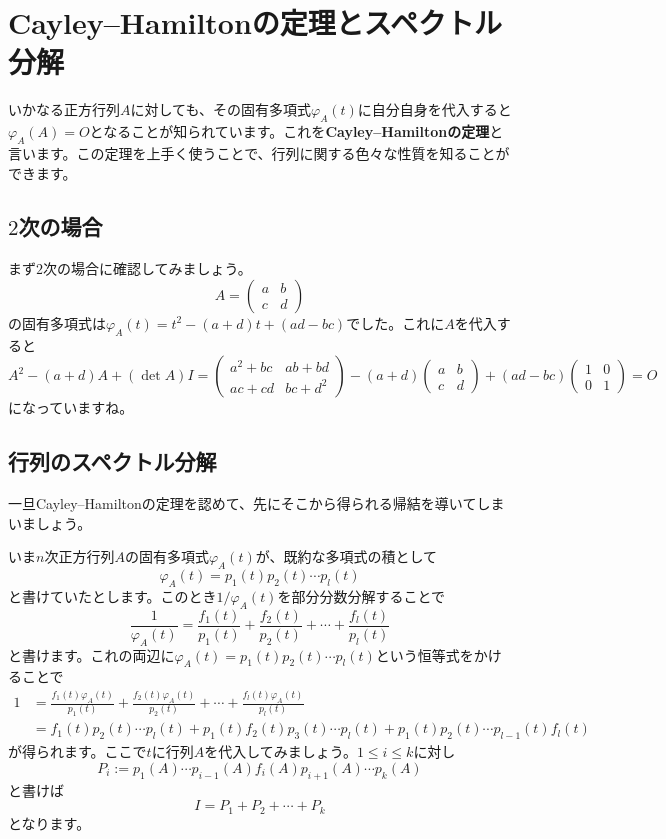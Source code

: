 \section{Cayley--Hamiltonの定理とスペクトル分解}

いかなる正方行列$A$に対しても、その固有多項式$\varphi_A(t)$に自分自身を代入すると$\varphi_A(A) = O$となることが知られています。これを\textbf{Cayley--Hamiltonの定理}と言います。この定理を上手く使うことで、行列に関する色々な性質を知ることができます。

\subsection{$2$次の場合}

まず$2$次の場合に確認してみましょう。
\[
A = 
\begin{pmatrix}
a & b \\
c & d
\end{pmatrix}
\]
の固有多項式は$\varphi_A(t) = t^2 - (a + d)t + (ad - bc)$でした。これに$A$を代入すると
\[
A^2 - (a + d)A + (\det A)I
= 
\begin{pmatrix}
a^2 + bc & ab + bd \\
ac + cd & bc + d^2
\end{pmatrix}
- (a + d)
\begin{pmatrix}
a & b \\
c & d
\end{pmatrix}
+ (ad - bc)
\begin{pmatrix}
1 & 0 \\
0 & 1
\end{pmatrix}
= O
\]
になっていますね。

\subsection{行列のスペクトル分解}

一旦Cayley--Hamiltonの定理を認めて、先にそこから得られる帰結を導いてしまいましょう。

いま$n$次正方行列$A$の固有多項式$\varphi_A(t)$が、既約な多項式の積として
\[
\varphi_A(t) = p_1(t) p_2(t) \cdots p_l(t)
\]
と書けていたとします。このとき$1/\varphi_A(t)$を部分分数分解することで
\[
\frac{1}{\varphi_A(t)} = \frac{f_1(t)}{p_1(t)} + \frac{f_2(t)}{p_2(t)} + \cdots + \frac{f_l(t)}{p_l(t)}
\]
と書けます。これの両辺に$\varphi_A(t) = p_1(t) p_2(t) \cdots p_l(t)$という恒等式をかけることで
\begin{align*}
1 &= \frac{f_1(t)\varphi_A(t)}{p_1(t)} + \frac{f_2(t)\varphi_A(t)}{p_2(t)} + \cdots + \frac{f_l(t)\varphi_A(t)}{p_l(t)} \\
&= f_1(t) p_2(t) \cdots p_l(t) + p_1(t) f_2(t) p_3(t) \cdots p_l(t) + p_1(t) p_2(t) \cdots p_{l - 1}(t) f_l(t)
\end{align*}
が得られます。ここで$t$に行列$A$を代入してみましょう。$1 \leq i \leq k$に対し
\[
P_i := p_1(A) \cdots p_{i - 1}(A) f_i(A) p_{i + 1}(A) \cdots p_k(A)
\]
と書けば
\[
I = P_1 + P_2 + \cdots + P_k
\]
となります。

